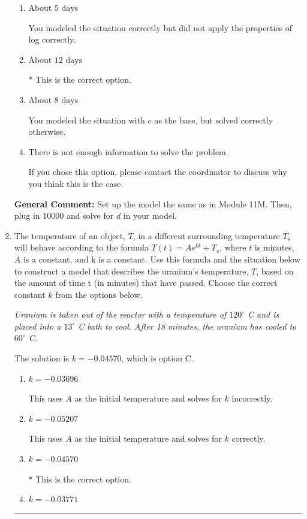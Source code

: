 \documentclass{extbook}[14pt]
\newcommand{\litem}[1]{\item #1

\rule{\textwidth}{0.4pt}}
\begin{document}
\begin{enumerate}
{\begin{enumerate}[label=\Alph*.]
You modeled the situation with $e$ as the base and did not apply the properties of log correctly.
\item \( \text{About } 5 \text{ days} \)

You modeled the situation correctly but did not apply the properties of log correctly.
\item \( \text{About } 12 \text{ days} \)

* This is the correct option.
\item \( \text{About } 8 \text{ days} \)

You modeled the situation with $e$ as the base, but solved correctly otherwise.
\item \( \text{There is not enough information to solve the problem.} \)

If you chose this option, please contact the coordinator to discuss why you think this is the case.
\end{enumerate}

\textbf{General Comment:} Set up the model the same as in Module 11M. Then, plug in 10000 and solve for $d$ in your model.
}
\litem{
The temperature of an object, $T$, in a different surrounding temperature $T_s$ will behave according to the formula $T(t) = Ae^{kt} + T_s$, where $t$ is minutes, $A$ is a constant, and k is a constant. Use this formula and the situation below to construct a model that describes the uranium's temperature, $T$, based on the amount of time t (in minutes) that have passed. Choose the correct constant $k$ from the options below.

\begin{center}
    \textit{ Uranium is taken out of the reactor with a temperature of $120^{\circ}$ C and is placed into a $13^{\circ}$ C bath to cool. After 18 minutes, the uranium has cooled to $60^{\circ}$ C. }
\end{center}
The solution is \( k = -0.04570 \), which is option C.\begin{enumerate}[label=\Alph*.]
\item \( k = -0.03696 \)

This uses $A$ as the initial temperature and solves for $k$ incorrectly.
\item \( k = -0.05207 \)

This uses $A$ as the initial temperature and solves for $k$ correctly.
\item \( k = -0.04570 \)

* This is the correct option.
\item \( k = -0.03771 \)


\end{enumerate}}
\end{enumerate}
\end{document}

